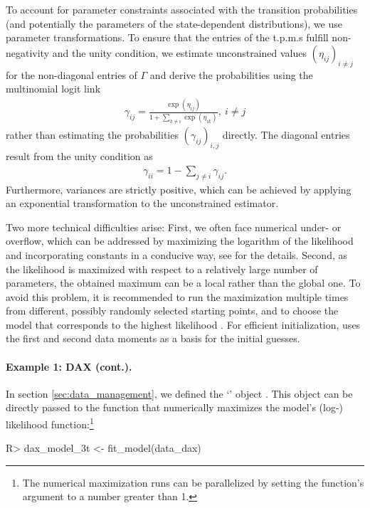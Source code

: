 \documentclass[article]{jss}
\newcommand{\class}[1]{`\code{#1}'}
\newcommand{\fct}[1]{\code{#1()}}
\begin{document}
To account for parameter constraints associated with the transition probabilities (and potentially the parameters of the state-dependent distributions), we use parameter transformations. To ensure that the entries of the t.p.m.s fulfill non-negativity and the unity condition, we estimate unconstrained values $(\eta_{ij})_{i\neq j}$ for the non-diagonal entries of $\Gamma$ and derive the probabilities using the multinomial logit link
\begin{align*}
\gamma_{ij}=\frac{\exp(\eta_{ij})}{1+\sum_{k\neq i}\exp(\eta_{ik})},~i\neq j
\end{align*}
rather than estimating the probabilities $(\gamma_{ij})_{i,j}$ directly. The diagonal entries result from the unity condition as
\begin{align*}
\gamma_{ii}=1-\sum_{j\neq i}\gamma_{ij}.
\end{align*}
Furthermore, variances are strictly positive, which can be achieved by applying an exponential transformation to the unconstrained estimator.

Two more technical difficulties arise: First, we often face numerical under- or overflow, which can be addressed by maximizing the logarithm of the likelihood and incorporating constants in a conducive way, see \cite{oel21} for the details. Second, as the likelihood is maximized with respect to a relatively large number of parameters, the obtained maximum can be a local rather than the global one. To avoid this problem, it is recommended to run the maximization multiple times from different, possibly randomly selected starting points, and to choose the model that corresponds to the highest likelihood \citep{zuc16}. For efficient initialization,  uses the first and second data moments as a basis for the initial guesses.

\paragraph{Example 1: DAX (cont.).} In section \ref{sec:data_management}, we defined the \class{fHMM\_data} object . This object can be directly passed to the \fct{fit\_model} function that numerically maximizes the model's (log-) likelihood function:\footnote{The numerical maximization runs can be parallelized by setting the function's  argument to a number greater than 1.}

%
\begin{Schunk}
\begin{Sinput}
R> dax_model_3t <- fit_model(data_dax)
\end{Sinput}
\end{Schunk}
%
\end{document}

